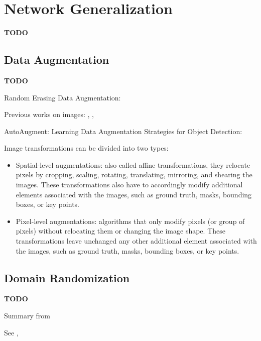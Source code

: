 \section{Network Generalization}
\label{sec:network-generalization}

\textbf{TODO}



\subsection{Data Augmentation}
\label{subsec:data-augmentation}

\textbf{TODO}

Random Erasing Data Augmentation: \cite{zhong2017random}

Previous works on images:  \cite{yue2019domain}, \cite{Takahashi_2020}, \cite{xie2020unsupervised}

AutoAugment: \cite{cubuk2019autoaugment}
Learning Data Augmentation Strategies for Object Detection: \cite{zoph2019learning}

\medskip

Image transformations can be divided into two types:
\begin{itemize}
	\item Spatial-level augmentations: also called affine transformations, they relocate pixels by cropping, scaling, rotating, translating, mirroring, and shearing the images. These transformations also have to accordingly modify additional elements associated with the images, such as ground truth, masks, bounding boxes, or key points.
	\item Pixel-level augmentations: algorithms that only modify pixels (or group of pixels) without relocating them or changing the image shape. These transformations leave unchanged any other additional element associated with the images, such as ground truth, masks, bounding boxes, or key points.
\end{itemize}



\subsection{Domain Randomization}
\label{subsec:domain-randomization}

\textbf{TODO}

Summary from \cite{mehta2019active}

See \cite{weng2019DR_explanation}, \cite{tobin2017domain}
 
